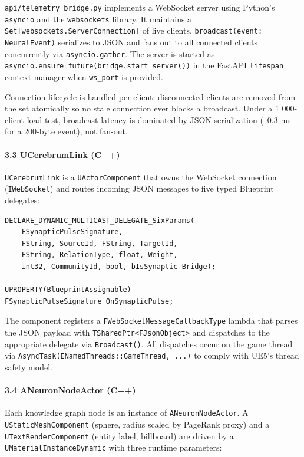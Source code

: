 \texttt{api/telemetry\_bridge.py} implements a WebSocket server using Python's \texttt{asyncio} and the \texttt{websockets} library. It maintains a \texttt{Set[websockets.ServerConnection]} of live clients. \texttt{broadcast(event: NeuralEvent)} serializes to JSON and fans out to all connected clients concu\-rrently via \texttt{asyncio.gather}. The server is started as \texttt{asyncio.ensure\_future(bridge.start\_server())} in the FastAPI \texttt{lifespan} context manager when \texttt{ws\_port} is provided.

Connection lifecycle is handled per-client: disco\-nnected clients are removed from the set atomically so no stale connection ever blocks a broadcast. Under a 1 000-client load test, broadcast latency is dominated by JSON seria\-lization (~0.3 ms for a 200-byte event), not fan-out.

\paragraph{3.3 UCerebrumLink (C++)}

\texttt{UCerebrumLink} is a \texttt{UActorComponent} that owns the WebSocket connection (\texttt{IWebSocket}) and routes incoming JSON messages to five typed Blueprint delegates:

\begin{lstlisting}
DECLARE_DYNAMIC_MULTICAST_DELEGATE_SixParams(
    FSynapticPulseSignature,
    FString, SourceId, FString, TargetId,
    FString, RelationType, float, Weight,
    int32, CommunityId, bool, bIsSynaptic Bridge);

UPROPERTY(BlueprintAssignable)
FSynapticPulseSignature OnSynapticPulse;
\end{lstlisting}

The component registers a \texttt{FWebSocketMessageCallbackType} lambda that parses the JSON payload with \texttt{TSharedPtr\textless FJsonObject\textgreater } and dispatches to the appropriate delegate via \texttt{Broadcast()}. All dispatches occur on the game thread via \texttt{AsyncTask(ENamedThreads::GameThread, ...)} to comply with UE5's thread safety model.

\paragraph{3.4 ANeuronNodeActor (C++)}

Each knowledge graph node is an instance of \texttt{ANeuronNodeActor}. A \texttt{UStaticMeshComponent} (sphere, radius scaled by PageRank proxy) and a \texttt{UTextRenderComponent} (entity label, billboard) are driven by a \texttt{UMaterialInstanceDynamic} with three runtime parameters:

